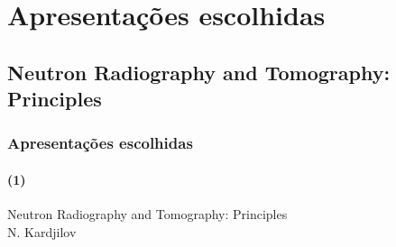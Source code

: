 \documentclass[svgnames,smaller,table]{beamer}
\begin{document}


\section{Apresentações escolhidas}
\subsection{Neutron Radiography and Tomography: Principles}
\begin{frame}
  \frametitle{Apresentações escolhidas}
  \framesubtitle{(1)}
  \begin{center}
    Neutron Radiography and Tomography: Principles\\
    \vspace{2.0cm}
    N. Kardjilov
  \end{center}
\end{frame}

\begin{frame}
  
\end{frame}

\begin{frame}
  
\end{frame}

\begin{frame}
    
\end{frame}

\begin{frame}
  
\end{frame}

\begin{frame}
  
\end{frame}

\begin{frame}
  
\end{frame}

\begin{frame}
  
\end{frame}

\begin{frame}
  
\end{frame}

\begin{frame}
  
\end{frame}
\end{document}
